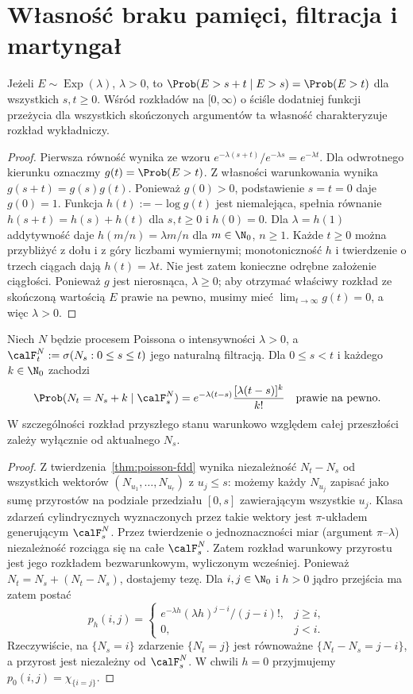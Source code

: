\section{Własność braku pamięci, filtracja i martyngał}
\begin{stwierdzenie}
Jeżeli $E\sim\operatorname{Exp}(\lambda)$, $\lambda>0$, to
$\Prob(E>s+t\mid E>s)=\Prob(E>t)$ dla wszystkich $s,t\ge0$.
Wśród rozkładów na $[0,\infty)$ o ściśle dodatniej
funkcji przeżycia dla wszystkich skończonych argumentów
ta własność charakteryzuje rozkład wykładniczy.
\end{stwierdzenie}
\begin{proof}
Pierwsza równość wynika ze wzoru
$e^{-\lambda(s+t)}/e^{-\lambda s}=e^{-\lambda t}$.
Dla odwrotnego kierunku oznaczmy $g(t)=\Prob(E>t)$.
Z własności warunkowania wynika $g(s+t)=g(s)g(t)$.
Ponieważ $g(0)>0$, podstawienie $s=t=0$ daje $g(0)=1$.
Funkcja $h(t):=-\log g(t)$ jest niemalejąca, spełnia
równanie $h(s+t)=h(s)+h(t)$ dla $s,t\ge0$ i $h(0)=0$.
Dla $\lambda=h(1)$ addytywność daje $h(m/n)=\lambda m/n$
dla $m\in\N_0$, $n\ge1$. Każde $t\ge0$ można przybliżyć
z dołu i z góry liczbami wymiernymi; monotoniczność $h$
i twierdzenie o trzech ciągach dają $h(t)=\lambda t$.
Nie jest zatem konieczne odrębne założenie ciągłości.
Ponieważ $g$ jest nierosnąca, $\lambda\ge0$; aby otrzymać
właściwy rozkład ze skończoną wartością $E$ prawie na pewno,
musimy mieć $\lim_{t\to\infty}g(t)=0$, a więc $\lambda>0$.
\end{proof}

\begin{twierdzenie}
Niech $N$ będzie procesem Poissona o intensywności $\lambda>0$,
a $\calF_t^N:=\sigma(N_s:0\le s\le t)$ jego naturalną
filtracją. Dla $0\le s<t$ i każdego $k\in\N_0$ zachodzi
\[
\Prob(N_t=N_s+k\mid\calF_s^N)
=e^{-\lambda(t-s)}\frac{[\lambda(t-s)]^k}{k!}
\quad\text{prawie na pewno}.
\]
W szczególności rozkład przyszłego stanu warunkowo względem
całej przeszłości zależy wyłącznie od aktualnego $N_s$.
\end{twierdzenie}
\begin{proof}
Z twierdzenia~\ref{thm:poisson-fdd} wynika niezależność
$N_t-N_s$ od wszystkich wektorów
$(N_{u_1},\ldots,N_{u_r})$ z $u_j\le s$:
możemy każdy $N_{u_j}$ zapisać jako sumę przyrostów na podziale
przedziału $[0,s]$ zawierającym wszystkie $u_j$.
Klasa zdarzeń cylindrycznych wyznaczonych przez takie wektory
jest $\pi$-układem generującym $\calF_s^N$.
Przez twierdzenie o jednoznaczności miar (argument
$\pi$--$\lambda$) niezależność rozciąga się na całe
$\calF_s^N$. Zatem rozkład warunkowy przyrostu jest jego
rozkładem bezwarunkowym, wyliczonym wcześniej.
Ponieważ $N_t=N_s+(N_t-N_s)$, dostajemy tezę.
Dla $i,j\in\N_0$ i $h>0$ jądro przejścia ma zatem postać
\[
p_h(i,j)=
\begin{cases}
e^{-\lambda h}(\lambda h)^{j-i}/(j-i)!,& j\ge i,\\
0,&j<i.
\end{cases}
\]
Rzeczywiście, na $\{N_s=i\}$ zdarzenie $\{N_t=j\}$
jest równoważne $\{N_t-N_s=j-i\}$, a przyrost jest
niezależny od $\calF_s^N$. W chwili $h=0$ przyjmujemy
$p_0(i,j)=\chi_{\{i=j\}}$.
\end{proof}

